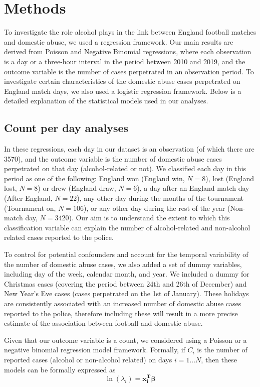 \documentclass[12pt, a4paper]{article}
\newcommand{\vect}[1]{\boldsymbol{#1}}
\begin{document}
\section{Methods}


To investigate the role alcohol plays in the link between England football matches and domestic abuse, we used a regression framework. Our main results are derived from Poisson and Negative Binomial regressions, where each observation is a day or a three-hour interval in the period between 2010 and 2019, and the outcome variable is the number of cases perpetrated in an observation period. To investigate certain characteristics of the domestic abuse cases perpetrated on England match days, we also used a logistic regression framework. Below is a detailed explanation of the statistical models used in our analyses.  


\subsection{Count per day analyses} 
\label{modelsexplained}


In these regressions, each day in our dataset is an observation (of which there are 3570), and the outcome variable is the number of domestic abuse cases perpetrated on that day (alcohol-related or not). We classified each day in this period as one of the following: England won (England win, $N = 8$), lost (England lost, $N = 8$) or drew (England draw, $N = 6$), a day after an England match day (After England, $N = 22$), any other day during the months of the tournament (Tournament on, $N = 106$), or any other day during the rest of the year (Non-match day, $N = 3420$). Our aim is to understand the extent to which this classification variable can explain the number of alcohol-related and non-alcohol related cases reported to the police.

To control for potential confounders and account for the temporal variability of the number of domestic abuse cases, we also added a set of dummy  variables, including day of the week, calendar month, and year. 
We included a dummy for Christmas cases (covering the period between 24th and 26th of December) and New Year's Eve cases (cases perpetrated on the 1st of January). 
These holidays are consistently associated with an increased number of domestic abuse cases reported to the police, therefore including these will result in a more precise estimate of the association between football and domestic abuse.

Given that our outcome variable is a count, we considered using a Poisson or a negative binomial regression model framework. 
Formally, if $C_i$ is the number of reported cases (alcohol or non-alcohol related) on days $i = 1...N$, then these models can be formally expressed as
%
\begin{equation}
 \ln(\lambda_i) =\vect{x_i^{T}}\vect{\beta}
\end{equation}
\end{document}
